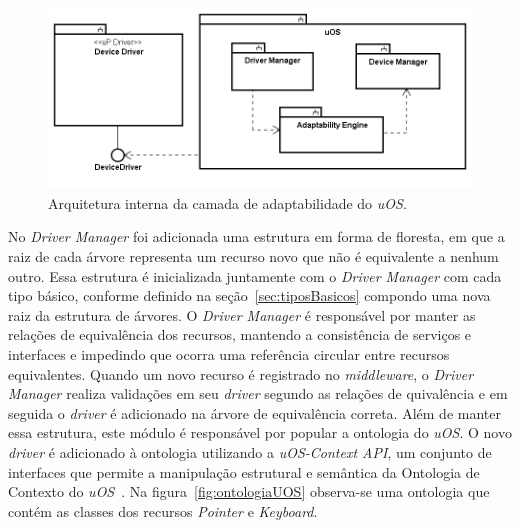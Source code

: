 \begin{figure}[ht]
	\center
	\includegraphics[scale=0.6]{imagens/diagramaDeBlocos}
	\caption{Arquitetura interna da camada de adaptabilidade do \emph{uOS}.}
	\label{fig:diagramaDeBlocos}
\end{figure}

No \emph{Driver Manager} foi adicionada uma estrutura em forma de floresta, em que a raiz de cada árvore representa um recurso novo que não é equivalente a nenhum outro. Essa estrutura é inicializada juntamente com o \emph{Driver Manager} com cada tipo básico, conforme definido na seção~\ref{sec:tiposBasicos} compondo uma nova raiz da estrutura de árvores. O \emph{Driver Manager} é responsável por manter as relações de equivalência dos recursos, mantendo a consistência de serviços e interfaces e impedindo que ocorra uma referência circular entre recursos equivalentes. Quando um novo recurso é registrado no \emph{middleware}, o \emph{Driver Manager} realiza validações em seu \emph{driver} segundo as relações de quivalência e em seguida o \emph{driver} é adicionado na árvore de equivalência correta. Além de manter essa estrutura, este módulo é responsável por popular a ontologia do \emph{uOS}. O novo \emph{driver} é adicionado à ontologia utilizando a \emph{uOS-Context API}, um conjunto de interfaces que permite a manipulação estrutural e semântica da Ontologia de Contexto do \emph{uOS}~\cite{ozakisbcup2011}. Na figura~\ref{fig:ontologiaUOS} observa-se uma ontologia que contém as classes dos recursos \emph{Pointer} e \emph{Keyboard}.

